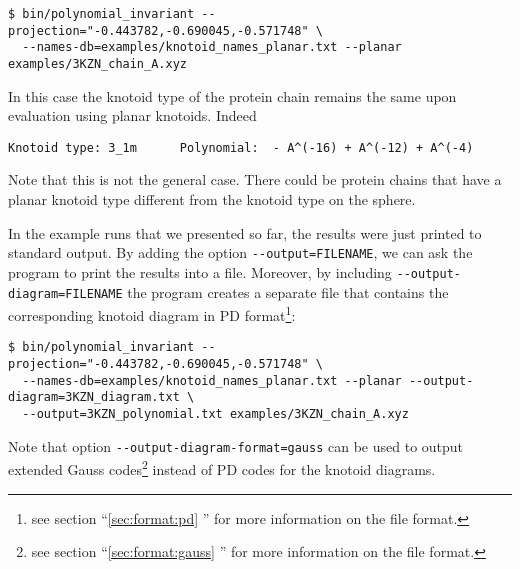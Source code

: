 \begin{lstlisting}
$ bin/polynomial_invariant --projection="-0.443782,-0.690045,-0.571748" \
  --names-db=examples/knotoid_names_planar.txt --planar examples/3KZN_chain_A.xyz
\end{lstlisting}
In this case the knotoid type of the protein chain remains the same upon evaluation using planar knotoids. Indeed
\begin{lstlisting}
Knotoid type: 3_1m      Polynomial:  - A^(-16) + A^(-12) + A^(-4)
\end{lstlisting}
Note that this is not the general case. There could be protein chains that have a planar knotoid type different from the knotoid type on the sphere.

In the example runs that we presented so far, the results were just printed to standard output. By adding the option \lstinline{--output=FILENAME}, we can ask the program to print the results into a file. Moreover, by including \lstinline{--output-diagram=FILENAME} the program creates a separate file that contains the corresponding knotoid diagram in PD format\footnote{see section ``\ref{sec:format:pd} '' for more information on the file format.}:
\begin{lstlisting}
$ bin/polynomial_invariant --projection="-0.443782,-0.690045,-0.571748" \
  --names-db=examples/knotoid_names_planar.txt --planar --output-diagram=3KZN_diagram.txt \ 
  --output=3KZN_polynomial.txt examples/3KZN_chain_A.xyz
\end{lstlisting}
Note that option \lstinline{--output-diagram-format=gauss} can be used to output extended Gauss codes\footnote{see section ``\ref{sec:format:gauss} '' for more information on the file format.} instead of PD codes for the knotoid diagrams.

